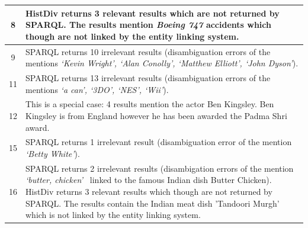 \documentclass[twocolumn]{svjour3}
\begin{document}
\begin{table}[]
\begin{tabular}{|c|p{155mm}|}
8                                                            & HistDiv returns 3 relevant results which are not returned by SPARQL. The results mention {\em Boeing 747} accidents which though are not linked by the entity linking system.                                                                                                                                                        \\ \hline
9                                                            & SPARQL returns 10 irrelevant results (disambiguation errors of the mentions {\em \lq{}Kevin Wright', \lq{}Alan Conolly', \lq{}Matthew Elliott', \lq{}John Dyson'}).                                                                                                                                                                                                                                   \\ \hline
11                                                           & SPARQL returns 13 irrelevant results (disambiguation errors of the mentions {\em \lq{}a can', \lq{}3DO', \lq{}NES', \lq{}Wii'}).                                                                                                                                                                                                                                                                           \\ \hline
12                                                           & This is a special case: 4 results mention the actor Ben Kingsley. Ben Kingsley is from England however he has been awarded the Padma Shri award.                                                                                                                                                                                                                                                                                          \\ \hline
15                                                           & SPARQL returns 1 irrelevant result (disambiguation error of the mention {\em \lq{}Betty White'}).                                                                                                                                                                                                                                                                                            \\ \hline
16                                                           & SPARQL returns 2 irrelevant results (disambigation errors of the mention {\em \lq{}butter, chicken'}~  linked to the famous Indian dish Butter Chicken). HistDiv returns 3 relevant results which though are not returned by SPARQL. The results contain the Indian meat dish 'Tandoori Murgh' which is not linked by the entity linking system.       \\ \hline

\end{tabular}
\end{table}
\end{document}
